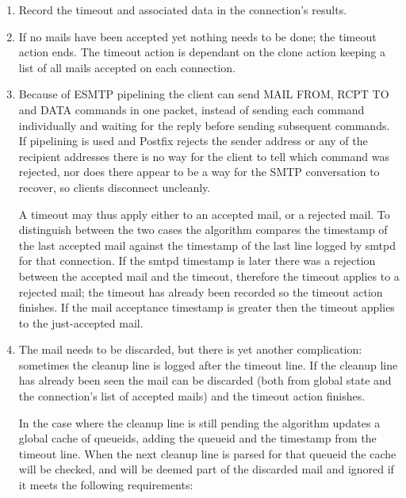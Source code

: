 \documentclass[a4paper,12pt,draft]{article}
\begin{document}
\begin{enumerate}

    \item Record the timeout and associated data in the connection's
        results.

    \item If no mails have been accepted yet nothing needs to be done; the
        timeout action ends.  The timeout action is dependant on the clone
        action keeping a list of all mails accepted on each connection.

    \item Because of ESMTP pipelining the client can send MAIL FROM, RCPT
        TO and DATA commands in one packet, instead of sending each command
        individually and waiting for the reply before sending subsequent
        commands.  If pipelining is used and Postfix rejects the sender
        address or any of the recipient addresses there is no way for the
        client to tell which command was rejected, nor does there appear to
        be a way for the SMTP conversation to recover, so clients
        disconnect uncleanly.

        A timeout may thus apply either to an accepted mail, or a rejected
        mail.  To distinguish between the two cases the algorithm compares
        the timestamp of the last accepted mail against the timestamp of
        the last line logged by smtpd for that connection.  If the smtpd
        timestamp is later there was a rejection between the accepted mail
        and the timeout, therefore the timeout applies to a rejected mail;
        the timeout has already been recorded so the timeout action
        finishes.  If the mail acceptance timestamp is greater then the timeout
        applies to the just-accepted mail.

    \item The mail needs to be discarded, but there is yet another
        complication: sometimes the cleanup line is logged after the
        timeout line.  If the cleanup line has already been seen the mail
        can be discarded (both from global state and the connection's list
        of accepted mails) and the timeout action finishes.
        
        In the case where the cleanup line is still pending the algorithm
        updates a global cache of queueids, adding the queueid and the
        timestamp from the timeout line.  When the next cleanup line is
        parsed for that queueid the cache will be checked, and will be
        deemed part of the discarded mail and ignored if it meets the
        following requirements:


\end{enumerate}
\end{document}
